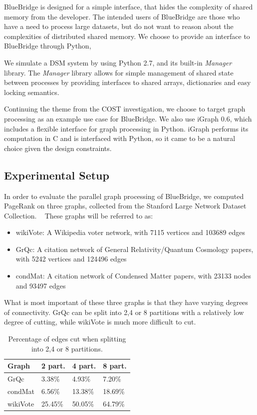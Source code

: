BlueBridge is designed for a simple interface, that hides the complexity of
shared memory from the developer. The intended users of BlueBridge are those who
have a need to process large datasets, but do not want to reason about the
complexities of distributed shared memory. We choose to provide an interface
to BlueBridge through Python, 

We simulate a DSM system by using Python 2.7, and its built-in \textit{Manager}
library. The \textit{Manager} library allows for simple management of shared
state between processes by providing interfaces to shared arrays, dictionaries
and easy locking semantics. 

Continuing the theme from the COST investigation, we choose to target graph
processing as an example use case for BlueBridge. We also use iGraph 0.6, which
includes a flexible interface for graph processing in Python. iGraph performs
its computation in C and is interfaced with Python, so it came to be a natural 
choice given the design constraints.

\subsection{Experimental Setup}

In order to evaluate the parallel graph processing of BlueBridge, we computed 
PageRank on three graphs, collected from the Stanford Large Network Dataset 
Collection. ~\cite{snapnets} These graphs will be referred to as:

\begin{itemize}
	\item wikiVote: A Wikipedia voter network, with 7115 vertices and 103689 edges
	\item GrQc: A citation network of General Relativity/Quantum Cosmology papers,
	 with 5242 vertices and 124496 edges
	\item condMat: A citation network of Condensed Matter papers, with 23133 nodes
	 and 93497 edges
\end{itemize}

What is most important of these three graphs is that they have varying degrees of
connectivity. GrQc can be split into 2,4 or 8 partitions with a relatively low
degree of cutting, while wikiVote is much more difficult to cut.

\begin{table}[h]
\begin{tabularx}{\linewidth}{|X|X|X|X|}
\hline
Graph & 2 part. & 4 part. & 8 part. \\ \hline \hline
GrQc & 3.38\% & 4.93\% & 7.20\% \\ \hline
condMat & 6.56\% & 13.38\% & 18.69\% \\ \hline
wikiVote & 25.45\% & 50.05\% & 64.79\% \\ \hline
\end{tabularx}
\caption{Percentage of edges cut when splitting into 2,4 or 8 partitions.}
\end{table}


